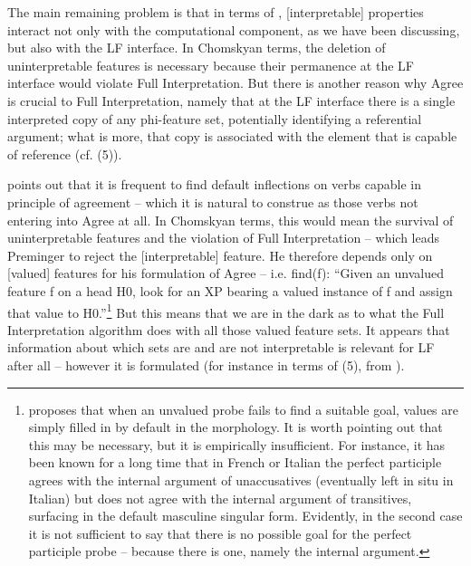 \documentclass[output=paper]{langsci/langscibook}
\begin{document}
The main remaining problem is that in terms of \citet{Chomsky2000,Chomsky2001Derivation}, [interpretable] properties interact not only with the computational component, as we have been discussing, but also with the LF interface. In Chomskyan terms, the deletion of uninterpretable features is necessary because their permanence at the LF interface would violate Full Interpretation. But there is another reason why Agree is crucial to Full Interpretation, namely {that at the LF interface there is a single interpreted copy of any phi-feature set, potentially identifying a referential argument; what is more, that copy is associated with the element that is capable of reference (cf. (5)).}

\citet{Preminger2014}{} points out that it is frequent to find default inflections on verbs capable in principle of agreement – which it is natural to construe as those verbs not entering into Agree at all.{} In Chomskyan terms, this would mean the survival of uninterpretable features and the violation of Full Interpretation – which leads Preminger to reject the [interpretable] feature. He therefore {depends only on [valued] features for his formulation of Agree – i.e.} {fi}{nd(f): “Given an unvalued feature f on a head H0, look for an XP bearing a valued instance of f and assign that value to H0.”}\footnote{\citet{Preminger2014} proposes that when an unvalued probe fails to find a suitable goal, values are simply filled in by default in the morphology. It is worth pointing out that this may be necessary, but it is empirically insufficient. For instance, it has been known for a long time \citep{Kayne1989} that in French or Italian the perfect participle agrees with the internal argument of unaccusatives (eventually left in situ in Italian) but does not agree with the internal argument of transitives, surfacing in the default masculine singular form. Evidently, in the second case it is not sufficient to say that there is no possible goal for the perfect participle probe – because there is one, namely the internal argument.} { But this means that we are in the dark as to what the Full Interpretation algorithm does with all those valued feature sets. It appears that information about which sets are and are not interpretable is relevant for LF after all – however it is formulated (for instance in terms of (5), from \citealt{Baker2008}).}
\end{document}
